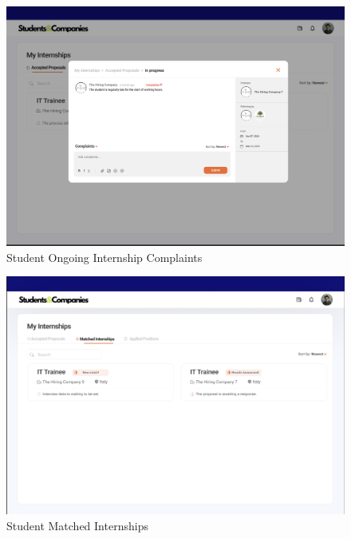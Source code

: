 \documentclass[a4paper,12pt]{article}
\begin{document}
\begin{figure}[H]
    \centering
    \includegraphics[scale = 0.42]{figures/UserInterfaces/Student/StudentComplaints.png}
    \caption{Student Ongoing Internship Complaints}
     \centering
\end{figure}
\begin{figure}[H]
    \centering
    \includegraphics[scale = 0.42]{figures/UserInterfaces/Student/MatchedInternships.png}
    \caption{Student Matched Internships}
     \centering
\end{figure}
\end{document}
